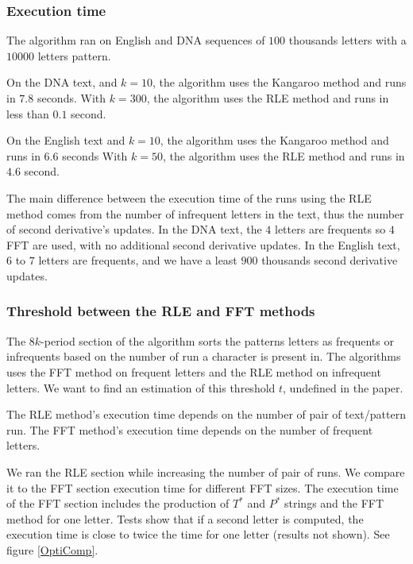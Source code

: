 \documentclass[preprint,12pt]{elsarticle}
\begin{document}
\subsubsection*{Execution time}

The algorithm ran on English and DNA sequences of $100$ thousands letters with a $10 000$ letters pattern.

On the DNA text, and $k = 10$, the algorithm uses the Kangaroo method and runs in $7.8$ seconds.
With $k = 300$, the algorithm uses the RLE method and runs in less than $0.1$ second.

On the English text and $k = 10$, the algorithm uses the Kangaroo method and runs in $6.6$ seconds
With $k = 50$, the algorithm uses the RLE method and runs in $4.6$ second.

The main difference between the execution time of the runs using the RLE method %
comes from the number of infrequent letters in the text, thus the number of second derivative's updates.
In the DNA text, the $4$ letters are frequents so $4$ FFT are used,
with no additional second derivative updates.
In the English text, $6$ to $7$ letters are frequents, and we have a least $900$ thousands second derivative updates.



\subsubsection*{Threshold between the RLE and FFT methods}

The $8k$-period section of the algorithm sorts the patterns letters as frequents or infrequents
based on the number of run a character is present in. 
The algorithms uses the FFT method on frequent letters
and the RLE method on infrequent letters.
We want to find an estimation of this threshold $t$, undefined in the paper.




The RLE method's execution time depends on the number of pair of text/pattern run.
The FFT method's execution time depends on the number of frequent letters.

We ran the RLE section while increasing the number of pair of runs.
We compare it to the FFT section execution time for different FFT sizes.
The execution time of the FFT section includes the production of $T^*$ and $P^*$ strings
and the FFT method for one letter.
Tests show that if a second letter is computed, the execution time is close to twice the time for one letter
(results not shown).
See figure \ref{OptiComp}.
\end{document}
